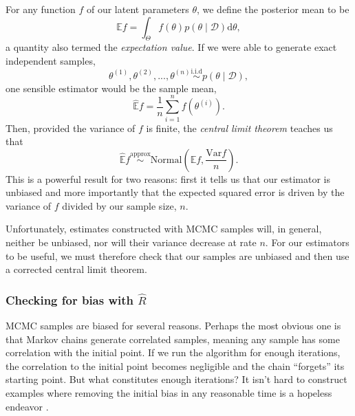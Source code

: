 For any function $f$ of our latent parameters $\theta$, we define the posterior mean to be
\begin{equation*}
  \mathbb E f = \int_\Theta f(\theta) p(\theta \mid \mathcal D) \mathrm d \theta,
\end{equation*}
%
a quantity also termed the \textit{expectation value}.
If we were able to generate exact independent samples, 
\begin{equation*}
  \theta^{(1)}, \theta^{(2)}, ..., \theta^{(n)} \overset{\mathrm{i.i.d}}{\sim} p(\theta \mid \mathcal D),
\end{equation*}
one sensible estimator would be the sample mean,
\begin{equation*}
  \hat {\mathbb E} f = \frac{1}{n} \sum_{i = 1}^n f \left (\theta^{(i)} \right).
\end{equation*}
%
Then, provided the variance of $f$ is finite, the \textit{central limit theorem} teaches us that
\begin{equation*}
  \hat {\mathbb E} f \overset{\mathrm{approx}}{\sim} \mathrm{Normal} \left ( \mathbb E f, \frac{\mathrm{Var} f}{n} \right ).
\end{equation*}
%
This is a powerful result for two reasons: first it tells us that our estimator is unbiased and more importantly that the expected squared error is driven by the variance of $f$ divided by our sample size, $n$.

Unfortunately, estimates constructed with MCMC samples will, in general, neither be unbiased, nor will their variance decrease at rate $n$.
For our estimators to be useful, we must therefore check that our samples are unbiased and then use a corrected central limit theorem.

\subsubsection{Checking for bias with $\hat R$}

MCMC samples are biased for several reasons.
Perhaps the most obvious one is that Markov chains generate correlated samples, meaning any sample has some correlation with the initial point.
If we run the algorithm for enough iterations, the correlation to the initial point becomes negligible and the chain ``forgets'' its starting point.
But what constitutes enough iterations?
It isn't hard to construct examples where removing the initial bias in any reasonable time is a hopeless endeavor \cite[e.g.][]{Margossian:2020b, Betancourt:2015}. 

